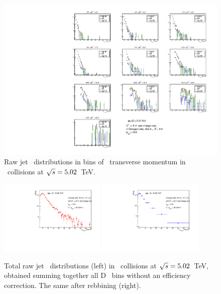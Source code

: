 \begin{figure}[bth]
\centering
\includegraphics[width=\textwidth]{pPbcuts_2sig/jetRawSpectrum_pTD3}
\caption{Raw jet \pt\ distributions in bins of \Dzero\ transverse momentum in \pp\ collisions at $\sqrt{s}=5.02$~TeV.}
\label{fig:eq_pPb_signBkgJet_Dzero_Dbins}
\end{figure}

\begin{figure}[bth]
\centering
	\includegraphics[width=0.45\textwidth]{pPbcuts_2sig/jetPtSpectrum_SB_pTD3_noeff}
	\includegraphics[width=0.45\textwidth]{pPbcuts_2sig/jetPtSpectrum_SB_Rebin_pTD3_noeff}
\caption{Total raw jet \pt\ distributions (left) in \pp\ collisions at $\sqrt{s}=5.02$~TeV, obtained summing together all D \pt\ bins without an efficiency correction. The same after rebbining (right).}
\label{fig:eq_pPb_signBkgJet_tot}
\end{figure}

